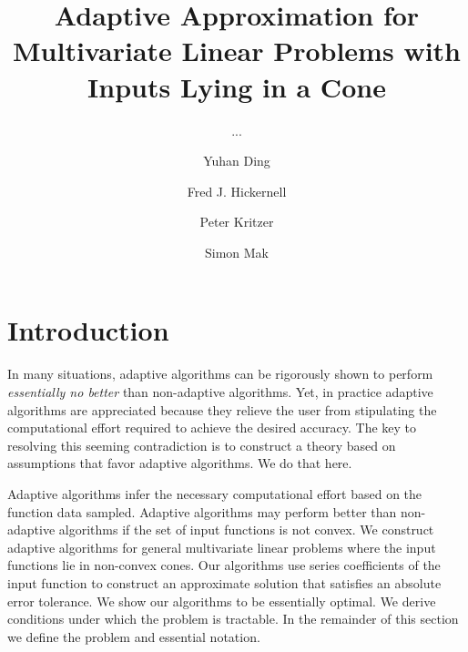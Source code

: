 \documentclass[USenglish]{article}
\theoremstyle{dgthm}
\theoremstyle{dgthm}
\theoremstyle{dgthm}
\theoremstyle{dgthm}
\theoremstyle{dgdef}
\theoremstyle{definition}
\begin{document}

  \author[1]{Yuhan Ding}
  \author*[2]{Fred J. Hickernell}
  \author[3]{Peter Kritzer} 
  \author[4]{Simon Mak}
  \title{Adaptive Approximation for Multivariate Linear Problems with Inputs Lying in a Cone}
  \subtitle{...}
  \aop

\maketitle


\section{Introduction} 

In many situations, adaptive algorithms can be rigorously shown to perform \emph{essentially no better} than non-adaptive algorithms.  Yet, in practice adaptive algorithms are appreciated because they relieve the user from stipulating the computational effort required to achieve the desired accuracy.  The key to resolving this seeming contradiction is to construct a theory based on assumptions that favor adaptive algorithms. We do that here.

Adaptive algorithms infer the necessary computational effort based on the function data sampled.  Adaptive algorithms may perform better than non-adaptive algorithms if the set of input functions is not convex. We construct adaptive algorithms for general multivariate linear problems where the input functions lie in non-convex cones.  Our algorithms use series coefficients of the input function to construct an approximate solution that satisfies an absolute error tolerance.  We show our algorithms to be essentially optimal.  We derive conditions under which the problem is tractable.  In the remainder of this section we define the problem and essential notation.
\end{document}
